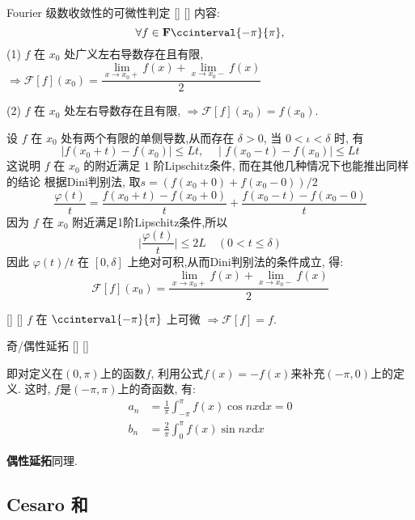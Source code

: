 \documentclass[UTF8]{ctexart}
\begin{document}
			\begin{thm}
			    []
			    {Fourier 级数收敛性的可微性判定}
			    []
			    []
				内容: 
				\[\forall f\in\mathbf{F}\ccinterval{-\pi}{\pi}, \]
				(1) \(f\) 在 \(x_0\) 处广义左右导数存在且有限, \(\Longrightarrow\mathcal{F}[f](x_0)=\dfrac{\lim\limits_{x\to x_0+}f(x)+\lim\limits_{x\to x_0-}f(x)}{2}\)

				(2) \(f\) 在 \(x_0\) 处左右导数存在且有限, \(\Longrightarrow\mathcal{F}[f](x_0)=f(x_0)\). 
			\end{thm}

            \begin{prf}
				设 \(f\) 在 \(x_0\) 处有两个有限的单侧导数,从而存在 \(\delta>0\), 当 \(0<\iota<\delta\) 时, 有
				\[\mid f(x_0+t)-f(x_0)\mid\leqslant Lt,\quad\mid f(x_0-t)-f(x_0)\mid\leqslant Lt\]
				这说明 \(f\) 在 \(x_0\) 的附近满足 \(1\) 阶Lipschitz条件, 而在其他几种情况下也能推出同样的结论
				根据Dini判别法, 取\(s=(f(x_0+0)+f(x_0-0))/2\)
				\[\frac{\varphi(t)}{t}=\frac{f(x_0+t)-f(x_0+0)}{t}+\frac{f(x_0-t)-f(x_0-0)}{t}\]
				因为 \(f\) 在 \(x_0\) 附近满足1阶Lipschitz条件,所以
				\[\bigg\vert\frac{\varphi(t)}{t}\bigg\vert\leqslant 2L\quad(0<t\leqslant\delta)\]
				因此 \(\varphi(t)/t\) 在 \([0,\delta]\) 上绝对可积,从而Dini判别法的条件成立, 得: 
				\[\mathcal{F}[f](x_0)=\frac{\lim\limits_{x\to x_0+}f(x)+\lim\limits_{x\to x_0-}f(x)}{2}\]
			\end{prf}

			\begin{crl}
			    []
			    {}
			    []
			    []
				\(f\) 在 \(\ccinterval{-\pi}{\pi}\) 上可微 \(\Longrightarrow\mathcal{F}[f]=f\). 
			\end{crl}
            
			\begin{dfn}
                []
			    {奇/偶性延拓}
			    []
			    []

				即对定义在\((0,\pi)\)上的函数\(f\), 利用公式\(f(x)=-f(x)\)来补充\((-\pi,0)\)上的定义. 这时, \(f\)是\((-\pi,\pi)\)上的奇函数, 有: 
				\[\begin{aligned}
					a_n&=\frac{1}{\pi}\int_{-\pi}^{\pi}f(x)\cos nx\text{d}x=0\\
					b_n&=\frac{2}{\pi}\int_{0}^{\pi}f(x)\sin nx\text{d}x
				\end{aligned}\]

				\textbf{偶性延拓}同理. 
			\end{dfn}

		\subsection{Cesaro 和}
\end{document}
